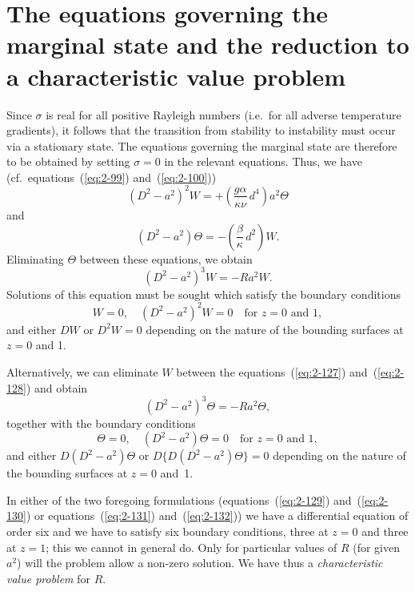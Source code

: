 \section{The equations governing the marginal state and the reduction to a characteristic value problem}\label{sec:12}

Since $\sigma$ is real for all positive Rayleigh numbers (i.e.\ for all adverse
temperature gradients), it follows that the transition from stability to
instability must occur via a stationary state. The equations governing
the marginal state are therefore to be obtained by setting $\sigma = 0$ in the
relevant equations. Thus, we have (cf.\ equations~(\ref{eq:2-99}) and~(\ref{eq:2-100}))
\begin{equation}
\label{eq:2-127}
(D^2-a^2)^2 W = +\left(\frac{g\alpha}{\kappa\nu}\,d^4\right)a^2\Theta
\end{equation}
and
\begin{equation}
\label{eq:2-128}
(D^2-a^2)\Theta = -\left(\frac{\beta}{\kappa}\,d^2\right)W.
\end{equation}
Eliminating $\Theta$ between these equations, we obtain
\begin{equation}
\label{eq:2-129}
(D^2-a^2)^3 W = -Ra^2 W.
\end{equation}
Solutions of this equation must be sought which satisfy the boundary
conditions
\begin{equation}
\label{eq:2-130}
W = 0, \quad (D^2-a^2)^2W = 0 \quad\text{for } z = 0 \text{ and } 1,
\end{equation}
and either $DW$ or $D^2W = 0$ depending on the nature of the
bounding surfaces at $z = 0$ and 1.

Alternatively, we can eliminate $W$ between the equations~(\ref{eq:2-127}) and~(\ref{eq:2-128}) and obtain
\begin{equation}
\label{eq:2-131}
(D^2-a^2)^3\Theta = -Ra^2\Theta,
\end{equation}
together with the boundary conditions
\begin{equation}
\label{eq:2-132}
\Theta = 0, \quad (D^2-a^2)\Theta = 0 \quad\text{for } z = 0 \text{ and } 1,
\end{equation}
and either $D(D^2-a^2)\Theta$ or $D\{D(D^2-a^2)\Theta\} = 0$ depending on the
nature of the bounding surfaces at $z = 0$ and~1.

In either of the two foregoing formulations (equations~(\ref{eq:2-129}) and~(\ref{eq:2-130}) or equations~(\ref{eq:2-131}) and~(\ref{eq:2-132})) we have a differential equation of order
six and we have to satisfy six boundary conditions, three at $z = 0$
and three at $z = 1$; this we cannot in general do. Only for particular
values of $R$ (for given $a^2$) will the problem allow a non-zero solution. We
have thus a \emph{characteristic value problem} for $R$.

